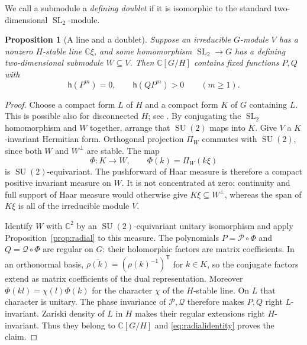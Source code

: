 \documentclass[11pt]{article}
\numberwithin{equation}{section}
\newtheorem{proposition}[theorem]{Proposition}
\theoremstyle{definition}
\theoremstyle{remark}
\newcommand{\C}{\mathbb C}
\newcommand{\h}{\mathsf h}
\newcommand{\SL}{\operatorname{SL}}
\newcommand{\SU}{\operatorname{SU}}
\begin{document}
We call a submodule a \emph{defining doublet} if it is isomorphic to the
standard two-dimensional $\SL_2$-module.

\begin{proposition}[A line and a doublet]\label{prop:linedoublet}
Suppose an irreducible $G$-module $V$ has a nonzero $H$-stable line
$\C\xi$, and some homomorphism $\SL_2\to G$ has a defining
two-dimensional submodule $W\subseteq V$. Then $\C[G/H]$ contains
fixed functions $P,Q$ with
\[
 \h(P^m)=0,\qquad \h(QP^m)>0\qquad(m\geq1).
\]
\end{proposition}
\begin{proof}
Choose a compact form $L$ of $H$ and a compact form $K$ of $G$ containing
$L$. This is possible also for disconnected $H$; see
\cite[Theorems~3.7--3.8]{AdamsTaibi}. By conjugating the $\SL_2$
homomorphism and $W$ together, arrange that $\SU(2)$ maps into $K$.
Give $V$ a $K$-invariant Hermitian form. Orthogonal projection $\Pi_W$
commutes with $\SU(2)$, since both $W$ and $W^\perp$ are stable.
The map
\[
 \Phi:K\to W,\qquad \Phi(k)=\Pi_W(k\xi)
\]
is $\SU(2)$-equivariant. The pushforward of Haar measure is therefore
a compact positive invariant measure on $W$.
It is not concentrated at zero: continuity and full support of Haar
measure would otherwise give $K\xi\subseteq W^\perp$,
whereas the span of $K\xi$ is all of the irreducible module $V$.

Identify $W$ with $\C^2$ by an $\SU(2)$-equivariant unitary isomorphism
and apply Proposition~\ref{prop:radial} to this measure. The polynomials
$P=\mathcal P\circ\Phi$ and $Q=\mathcal Q\circ\Phi$ are regular on $G$:
their holomorphic factors are matrix coefficients. In an orthonormal
basis, $\overline{\rho(k)}=(\rho(k)^{-1})^{\mathsf T}$ for $k\in K$,
so the conjugate factors extend as matrix coefficients of the dual
representation. Moreover $\Phi(kl)=\chi(l)\Phi(k)$ for the character
$\chi$ of the $H$-stable line. On $L$ that character is unitary.
The phase invariance of $\mathcal P,\mathcal Q$ therefore makes $P,Q$
right $L$-invariant. Zariski density of $L$ in $H$ makes their regular
extensions right $H$-invariant. Thus they belong to $\C[G/H]$ and
\eqref{eq:radialidentity} proves the claim.
\end{proof}
\end{document}
